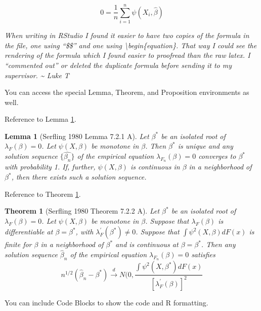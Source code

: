 \documentclass[
  12pt,
  openany, oneside]{book}
\newtheorem{theorem}{Theorem}[chapter]
\newtheorem{lemma}{Lemma}[chapter]
\theoremstyle{definition}
\theoremstyle{definition}
\theoremstyle{definition}
\theoremstyle{definition}
\theoremstyle{remark}
\begin{document}
\[
0 = \frac{1}{n}\sum_{i=1}^n \psi(X_i,\hat{\beta})
\]

\emph{When writing in RStudio I found it easier to have two copies of the formula in the file, one using ``\$\$'' and one using \textbackslash begin\{equation\}. That way I could see the rendering of the formula which I found easier to proofread than the raw latex. I ``commented out'' or deleted the duplicate formula before sending it to my supervisor. \textasciitilde{} Luke T}

You can access the special Lemma, Theorem, and Proposition environments as well.

Reference to Lemma \ref{lem:Sefling721A}.

\begin{lemma}[Serfling 1980 Lemma 7.2.1 A]
\protect\hypertarget{lem:Sefling721A}{}\label{lem:Sefling721A}Let \(\beta^*\) be an isolated root of \(\lambda_F(\beta) = 0\). Let \(\psi(X,\beta)\) be monotone in \(\beta\). Then \(\beta^*\) is unique and any solution sequence \(\{\hat{\beta_n}\}\) of the empirical equation \(\lambda_{F_n}(\beta) = 0\) converges to \(\beta^*\) with probability 1. If, further, \(\psi(X,\beta)\) is continuous in \(\beta\) in a neighborhood of \(\beta^*\), then there exists such a solution sequence.
\end{lemma}

Reference to Theorem \ref{thm:Sefling722A}.

\begin{theorem}[Serfling 1980 Theorem 7.2.2 A]
\protect\hypertarget{thm:Sefling722A}{}\label{thm:Sefling722A}Let \(\beta^*\) be an isolated root of \(\lambda_F(\beta) = 0\). Let \(\psi(X,\beta)\) be monotone in \(\beta\). Suppose that \(\lambda_F(\beta)\) is differentiable at \(\beta = \beta^*\), with \(\lambda^\prime_F(\beta^*) \neq 0\). Suppose that \(\int\psi^2(X,\beta)dF(x)\) is finite for \(\beta\) in a neighborhood of \(\beta^*\) and is continuous at \(\beta = \beta^*\). Then any solution sequence \(\hat{\beta}_n\) of the empirical equation \(\lambda_{F_n}(\beta) = 0\) satisfies
\[
n^{1/2}(\hat{\beta}_n - \beta^*) \overset{d}\to N(0,\frac{\int\psi^2(X,\beta^*)dF(x) }{ [\lambda^\prime_F(\beta)]^2}
\]
\end{theorem}

You can include Code Blocks to show the code and R formatting.
\end{document}
